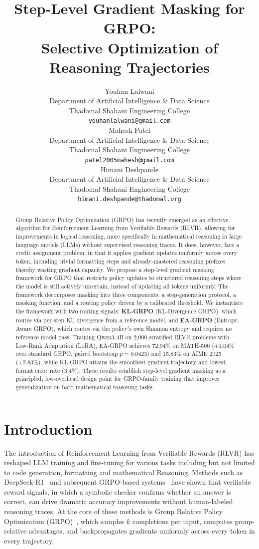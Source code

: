 \documentclass{article}
\title{Step-Level Gradient Masking for GRPO:\\ Selective Optimization of Reasoning Trajectories}
\author{%
  Youhan Lalwani \\
  Department of Artificial Intelligence \& Data Science \\
  Thadomal Shahani Engineering College \\
  \texttt{youhanlalwani@gmail.com} \\
  \And
  Mahesh Patel \\
  Department of Artificial Intelligence \& Data Science \\
  Thadomal Shahani Engineering College \\
  \texttt{patel2005mahesh@gmail.com} \\
  \And
  Himani Deshpande \\
  Department of Artificial Intelligence \& Data Science\\
  Thadomal Shahani Engineering College \\
  \texttt{himani.deshpande@thadomal.org} \\
}
\begin{document}
\maketitle

\begin{abstract}
Group Relative Policy Optimization (GRPO) has recently emerged as an effective algorithm for Reinforcement Learning from Verifiable Rewards (RLVR), allowing for improvements in logical reasoning, more specifically in mathematical reasoning in large language models (LLMs) without supervised reasoning traces. It does, however, face a credit assignment problem, in that it applies gradient updates uniformly across every token, including trivial formatting steps and already-mastered reasoning prefixes thereby wasting gradient capacity. We propose a step-level gradient masking framework for GRPO that restricts policy updates to structured reasoning steps where the model is still actively uncertain, instead of updating all tokens uniformly. The framework decomposes masking into three components: a step-generation protocol, a masking function, and a routing policy driven by a calibrated threshold. We instantiate the framework with two routing signals: \textbf{KL-GRPO} (KL-Divergence GRPO), which routes via per-step KL divergence from a reference model, and \textbf{EA-GRPO} (Entropy-Aware GRPO), which routes via the policy's own Shannon entropy and requires no reference model pass. Training Qwen3-4B on 2,000 stratified RLVR problems with Low-Rank Adaptation (LoRA), EA-GRPO achieves 72.94\% on MATH-500 (+1.04\% over standard GRPO, paired bootstrap $p=0.0423$) and 15.83\% on AIME 2025 (+2.83\%), while KL-GRPO attains the smoothest gradient trajectory and lowest format error rate (3.4\%). These results establish step-level gradient masking as a principled, low-overhead design point for GRPO-family training that improves generalization on hard mathematical reasoning tasks.
\end{abstract}



\section{Introduction}

The introduction of Reinforcement Learning from Verifiable Rewards (RLVR) has reshaped LLM training and fine-tuning for various tasks including but not limited to code generation, formatting and mathematical Reasoning. Methods such as DeepSeek-R1~\cite{Guo_2025} and subsequent GRPO-based systems~\cite{shao2024deepseekmath} have shown that verifiable reward signals, in which a symbolic checker confirms whether an answer is correct, can drive dramatic accuracy improvements without human-labeled reasoning traces. At the core of these methods is Group Relative Policy Optimization (GRPO)~\cite{shao2024deepseekmath}, which samples $k$ completions per input, computes group-relative advantages, and backpropagates gradients uniformly across every token in every trajectory. 
\end{document}
